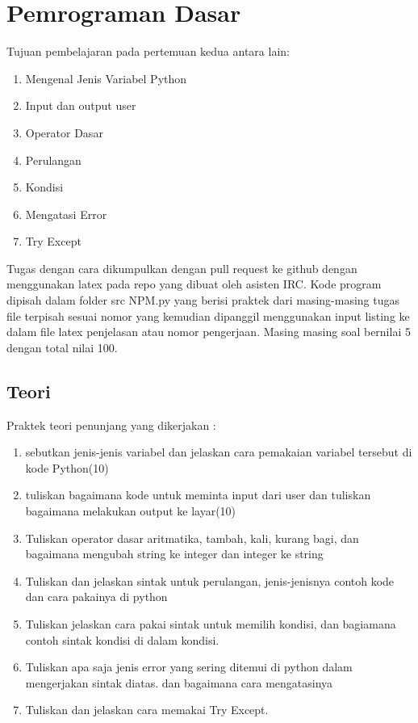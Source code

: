 \chapter{Pemrograman Dasar}
Tujuan pembelajaran pada pertemuan kedua antara lain:
\begin{enumerate}
\item
Mengenal Jenis Variabel Python
\item
Input dan output user
\item
Operator Dasar
\item
Perulangan
\item
Kondisi
\item
Mengatasi Error
\item
Try Except
\end{enumerate}
Tugas dengan cara dikumpulkan dengan pull request ke github dengan menggunakan latex pada repo yang dibuat oleh asisten IRC. Kode program dipisah dalam folder src NPM.py yang berisi praktek dari masing-masing tugas file terpisah sesuai nomor yang kemudian dipanggil menggunakan input listing ke dalam file latex penjelasan atau nomor pengerjaan. Masing masing soal bernilai 5 dengan total nilai 100.

\section{Teori}
Praktek teori penunjang yang dikerjakan :
\begin{enumerate}
\item
sebutkan jenis-jenis variabel dan jelaskan cara pemakaian variabel tersebut di kode Python(10)
\item
tuliskan bagaimana kode untuk meminta input dari user dan tuliskan bagaimana melakukan output ke layar(10)
\item
Tuliskan operator dasar aritmatika, tambah, kali, kurang bagi, dan 
bagaimana mengubah string ke integer dan integer ke string
\item
Tuliskan dan jelaskan sintak untuk perulangan, jenis-jenisnya contoh kode dan cara pakainya di python
\item
Tuliskan jelaskan cara pakai sintak untuk memilih kondisi, dan bagiamana contoh sintak kondisi di dalam kondisi.
\item
Tuliskan apa saja jenis error yang sering ditemui di python dalam mengerjakan sintak diatas. 
dan bagaimana cara mengatasinya
\item
Tuliskan dan jelaskan cara memakai Try Except.
\end{enumerate}


